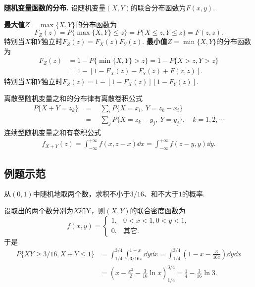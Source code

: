 \documentclass[11pt]{ctexart}
\begin{document}
 \noindent\textbf{随机变量函数的分布.}
设随机变量$(X,Y)$的联合分布函数为$F(x,y)$. 
 
\textbf{最大值}$Z = \max\{X, Y\}$的分布函数为
\begin{equation*}
	F_Z(z) 
	= P\{\max\{X, Y\} \leq z\}
	= P\{X \leq z, Y \leq z\}
	= F(z,z). 
\end{equation*}
特别当$X$和$Y$独立时$F_Z(z) = F_X(z) F_Y(z)$. 
\textbf{最小值}$Z = \min\{X,Y\}$的分布函数为
\begin{align*}
	F_Z(z)
	&= 1 - P\{\min\{X, Y\} > z\}
	= 1 - P\{X > z, Y > z\} \\
	&= 1 - \left[ 1 - F_X(z) - F_Y(z) + F(z,z) \right].
\end{align*}
特别当$X$和$Y$独立时$F_Z(z) = 1 - [1- F_X(z)][1- F_Y(z)]$. 

离散型随机变量之和的分布律有离散卷积公式
$$
\begin{aligned}
	P\{X+Y=z_k\}
	&=\quad\sum_iP\{X=x_i,\:Y=z_k-x_i\}\\
	&=\quad\sum_jP\{X=z_k-y_j,\:Y=y_j\},\quad k=1,2,\cdots
\end{aligned}
$$
连续型随机变量之和有卷积公式
$$
\begin{aligned}
	f_{X+Y}(z)
	=\int_{-\infty}^{+\infty}f(x,z-x)\dd x
	=\int_{-\infty}^{+\infty}f(z-y,y)\dd y.
\end{aligned}
$$

\subsection{例题示范}

\begin{example}
	从$(0,1)$中随机地取两个数，求积不小于$3/16$、和不大于$1$的概率.
\end{example}
\begin{solution}
	设取出的两个数分别为$X$和Y，则$(X,Y)$的联合密度函数为
	\begin{equation*}
		f(x, y) = 
			\begin{cases}
				1, & 0 < x < 1, 0 < y < 1, \\
				0, & \text{其它}. 
			\end{cases}
	\end{equation*}
	于是
	\begin{align*}
		P\{XY \geq 3/16, X + Y \leq 1\}
		&= \int_{1/4}^{3/4} \int_{3/16x}^{1-x} \dd y \dd x
		= \int_{1/4}^{3/4} \left( 1 - x - \frac{3}{16 x} \right) \dd y \dd x \\
		&= \left(x - \frac{x^2}{2} - \frac{3}{16} \ln x \right)_{1/4}^{3/4}
		= \frac{1}{4} - \frac{3}{16} \ln 3. 
	\end{align*}
\end{solution}
\end{document}
